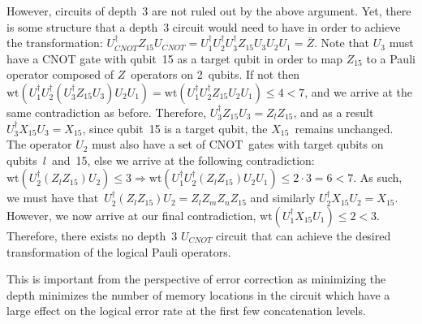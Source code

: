 \documentclass[pra,longbibliography,twocolumn,showpacs,nofootinbib,superscriptaddress,notitlepage]{revtex4-1}
\begin{document}
However, circuits of depth~3 are not ruled out by the above argument. Yet, there is some structure that a depth~3 circuit would need to have in order to achieve the transformation: $U_{CNOT}^{\dagger} Z_{15} U_{CNOT} =  U_1^{\dagger} U_2^{\dagger}U_3^{\dagger} Z_{15} U_3 U_2 U_1 = \overline{Z}$. Note that $U_3$ must have a CNOT gate with qubit~15 as a target qubit in order to map $Z_{15}$ to a Pauli operator composed of $Z$~operators on 2~qubits. If not then $\text{wt}(U_1^{\dagger} U_2^{\dagger}(U_3^{\dagger} Z_{15} U_3) U_2 U_1) = \text{wt}(U_1^{\dagger} U_2^{\dagger} Z_{15} U_2 U_1) \le 4 < 7$, and we arrive at the same contradiction as before. Therefore, $U_3^{\dagger} Z_{15} U_3 = Z_l Z_{15}$, and as a result $U_3^{\dagger} X_{15} U_3 = X_{15}$, since qubit~15 is a target qubit, the $X_{15}$~remains unchanged. The operator $U_2$ must also have a set of CNOT~gates with target qubits on qubits~$l$~and~15, else we arrive at the following contradiction: $\text{wt}(U_2^{\dagger}(Z_l Z_{15})U_2) \le 3 \Rightarrow \text{wt}(U_1^{\dagger} U_2^{\dagger}(Z_l Z_{15})U_2 U_1) \le 2\cdot 3 = 6 < 7$. As such, we must have that~$U_2^{\dagger}(Z_l Z_{15})U_2 = Z_l Z_m Z_n Z_{15}$ and similarly $U_2^{\dagger} X_{15} U_2 = X_{15}$. However, we now arrive at our final contradiction, $\text{wt}(U_1^{\dagger}X_{15}U_1) \le 2 < 3$. Therefore, there exists no depth~3 $U_{CNOT}$ circuit that can achieve the desired transformation of the logical Pauli operators.

This is important from the perspective of error correction as minimizing the depth minimizes the number of memory locations in the circuit which have a large effect on the logical error rate at the first few concatenation levels.
\end{document}
